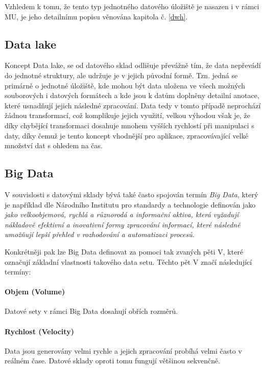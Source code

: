 \documentclass[
  digital,     %
  twoside,     %
  lof,         %
  lot,         %
]{fithesis4}
\begin{document}
Vzhledem k tomu, že tento typ jednotného datového úložiště je nasazen i v rámci MU, je jeho detailnímu popisu věnována kapitola č. 
 \ref{dwh}.

\subsection{Data lake}
Koncept Data lake, se od datového sklad odlišuje převážně tím, že data nepřevádí do jednotné struktury, ale udržuje je v jejich původní formě. Tzn. jedná se primárně o jednotné úložiště, kde mohou být data uložena ve všech možných souborových i datových formátech a kde jsou k datům doplněny detailní anotace, které usnadňují jejich následné zpracování.\parencite{Foote19042018} Data tedy v tomto případě neprochází žádnou transformací, což komplikuje jejich využití, velkou výhodou však je, že  díky chybějící  transformaci dosahuje mnohem vyšších rychlostí při manipulaci s daty, díky čemuž je tento koncept vhodnější pro aplikace, zpracovávající velké množství dat s ohledem na čas.\parencite[s.~1]{Harby20221217}



\subsection{Big Data}
V souvislosti s datovými sklady bývá také často spojován termín \emph{Big Data}, který je například dle Národního Institutu pro standardy a technologie definován jako \emph{jako velkoobjemová, rychlá a různorodá a informační aktiva, která vyžadují nákladově efektivní a inovativní formy zpracování informací, které následně umožňují lepší přehled v rozhodování a automatizaci procesů.  } \parencite{Gartner} 

Konkrétněji pak lze Big Data definovat za pomoci tak zvaných pěti V, které označují základní vlastnosti takového data setu.  Těchto pět V značí následující termíny: \parencite{big_data}
\paragraph{Objem (Volume) }
Datové sety v rámci Big Data dosahují obřích rozměrů.

\paragraph{Rychlost (Velocity)}
Data jsou generovány velmi rychle a jejich zpracování probíhá velmi často v reálném čase. Datové sklady oproti tomu fungují většinou sekvenčně.
\end{document}
